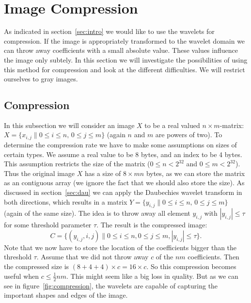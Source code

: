 
\section{Image Compression}
\label{sec:img}

As indicated in section~\ref{sec:intro} we would like to use the wavelets for compression. If the image is appropriately transformed to the wavelet domain we can throw away coefficients with a small absolute value. These values influence the image only subtely. In this section we will investigate the possibilities of using this method for compression and look at the different difficulties. We will restrict ourselves to gray images.

\subsection{Compression}
In this subsection we will consider an image $X$ to be a real valued $n \times m$-matrix: $X = \{x_{i,j} \| 0 \leq i \leq n,\, 0 \leq j \leq m\}$ (again $n$ and $m$ are powers of two). To determine the compression rate we have to make some assumptions on sizes of certain types. We assume a real value to be 8 bytes, and an index to be 4 bytes. This assumption restricts the size of the matrix ($0 \leq n < 2^32$ and $0 \leq m < 2^32$). Thus the original image $X$ has a size of $8 \times mn$ bytes, as we can store the matrix as an contiguous array (we ignore the fact that we should also store the size). As discussed in section~\ref{sec:dau} we can apply the Daubechies wavelet transform in both directions, which results in a matrix $Y = \{y_{i,j} \| 0 \leq i \leq n,\, 0 \leq j \leq m\}$ (again of the same size). The idea is to throw away all element $y_{i,j}$ with $|y_{i,j}| \leq \tau$ for some threshold parameter $\tau$. The result is the compressed image:
\[ C = \{ (y_{i,j}, i, j) \| 0 \leq i \leq n, 0 \leq j \leq m, |y_{i,j}| \leq \tau \}. \]
Note that we now have to store the location of the coefficients bigger than the threshold $\tau$. Assume that we did not throw away $c$ of the $nm$ coefficients. Then the compressed size is $(8+4+4) \times c = 16 \times c$. So this compression becomes useful when $c \leq \frac{1}{2}nm$. This might seem like a big loss in quality. But as we can see in figure~\ref{fig:compression}, the wavelets are capable of capturing the important shapes and edges of the image.



